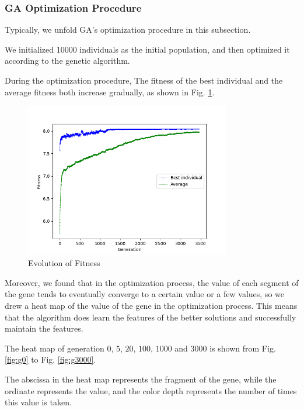 \documentclass{llncs}
\begin{document}
\subsubsection{GA Optimization Procedure}
Typically, we unfold GA's optimization procedure in this subsection. 

We initialized 10000 individuals as the initial population, and then optimized it according to the genetic algorithm.

During the optimization procedure, The fitness of the best individual and the average fitness both increase gradually, as shown in Fig. \ref{fig:fitness}.
\begin{figure}
    \centering
    \includegraphics[width=0.8\textwidth]{Figures/fitness.png}
    \caption{Evolution of Fitness}
    \label{fig:fitness}
\end{figure}

Moreover, we found that in the optimization process, the value of each segment of the gene tends to eventually converge to a certain value or a few values, so we drew a heat map of the value of the gene in the optimization process. This means that the algorithm does learn the features of the better solutions and successfully maintain the features.

The heat map of generation $0$, $5$, $20$, $100$, $1000$ and $3000$ is shown from Fig. \ref{fig:g0} to Fig. \ref{fig:g3000}.

The abscissa in the heat map represents the fragment of the gene, while the ordinate represents the value, and the color depth represents the number of times this value is taken.
\end{document}
